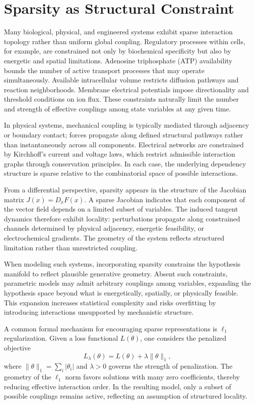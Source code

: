 \documentclass[12pt]{book}
\begin{document}
\section{Sparsity as Structural Constraint}

Many biological, physical, and engineered systems exhibit sparse interaction topology rather than uniform global coupling. Regulatory processes within cells, for example, are constrained not only by biochemical specificity but also by energetic and spatial limitations. Adenosine triphosphate (ATP) availability bounds the number of active transport processes that may operate simultaneously. Available intracellular volume restricts diffusion pathways and reaction neighborhoods. Membrane electrical potentials impose directionality and threshold conditions on ion flux. These constraints naturally limit the number and strength of effective couplings among state variables at any given time.

In physical systems, mechanical coupling is typically mediated through adjacency or boundary contact; forces propagate along defined structural pathways rather than instantaneously across all components. Electrical networks are constrained by Kirchhoff's current and voltage laws, which restrict admissible interaction graphs through conservation principles. In each case, the underlying dependency structure is sparse relative to the combinatorial space of possible interactions.

From a differential perspective, sparsity appears in the structure of the Jacobian matrix $J(x) = D_x F(x)$. A sparse Jacobian indicates that each component of the vector field depends on a limited subset of variables. The induced tangent dynamics therefore exhibit locality: perturbations propagate along constrained channels determined by physical adjacency, energetic feasibility, or electrochemical gradients. The geometry of the system reflects structured limitation rather than unrestricted coupling.

When modeling such systems, incorporating sparsity constrains the hypothesis manifold to reflect plausible generative geometry. Absent such constraints, parametric models may admit arbitrary couplings among variables, expanding the hypothesis space beyond what is energetically, spatially, or physically feasible. This expansion increases statistical complexity and risks overfitting by introducing interactions unsupported by mechanistic structure.

A common formal mechanism for encouraging sparse representations is $\ell_1$ regularization. Given a loss functional $L(\theta)$, one considers the penalized objective
\[
L_\lambda(\theta)
=
L(\theta)
+
\lambda \|\theta\|_1,
\]
where $\|\theta\|_1 = \sum_i |\theta_i|$ and $\lambda > 0$ governs the strength of penalization. The geometry of the $\ell_1$ norm favors solutions with many zero coefficients, thereby reducing effective interaction order. In the resulting model, only a subset of possible couplings remains active, reflecting an assumption of structured locality.
\end{document}
